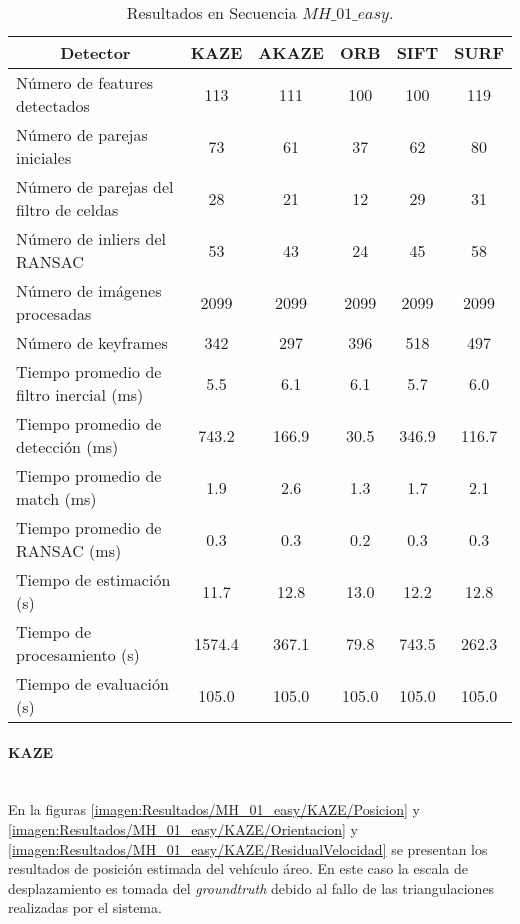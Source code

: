 \begin{table}[H]
	\caption{Resultados en Secuencia $MH\_ 01\_ easy$.}
	\begin{tabular}{|l|c|c|c|c|c|}
		\hline
		\multicolumn{1}{|c|}{\textbf{Detector}} & \textbf{KAZE} & \textbf{AKAZE} & \textbf{ORB} & \textbf{SIFT} & \textbf{SURF} \\ \hline
		Número de features detectados & 113 & 111 & 100 & 100 & 119 \\ \hline
		Número de parejas iniciales & 73 & 61 & 37 & 62 & 80 \\ \hline
		Número de parejas del filtro de celdas & 28 & 21 & 12 & 29 & 31 \\ \hline
		Número de inliers del RANSAC & 53 & 43 & 24 & 45 & 58 \\ \hline
		Número de imágenes procesadas & 2099 & 2099 & 2099 & 2099 & 2099 \\ \hline
		Número de keyframes & 342 & 297 & 396 & 518 & 497 \\ \hline
		Tiempo promedio de filtro inercial (ms) & 5.5 & 6.1 & 6.1 & 5.7 & 6.0 \\ \hline
		Tiempo promedio de detección  (ms) & 743.2 & 166.9 & 30.5 & 346.9 & 116.7 \\ \hline
		Tiempo promedio de match (ms) & 1.9 & 2.6 & 1.3 & 1.7 & 2.1 \\ \hline
		Tiempo promedio de RANSAC (ms) & 0.3 & 0.3 & 0.2 & 0.3 & 0.3 \\ \hline
		Tiempo de estimación (s) & 11.7 & 12.8 & 13.0 & 12.2 & 12.8 \\ \hline
		Tiempo de  procesamiento (s) & 1574.4 & 367.1 & 79.8 & 743.5 & 262.3 \\ \hline
		Tiempo de evaluación (s) & 105.0 & 105.0 & 105.0 & 105.0 & 105.0 \\ \hline
	\end{tabular}
	\label{Tabla/Resultados/MH_01_easy}
\end{table}



\paragraph {KAZE \\ \\}


En la figuras \ref{imagen:Resultados/MH_01_easy/KAZE/Posicion} y \ref{imagen:Resultados/MH_01_easy/KAZE/Orientacion} y \ref{imagen:Resultados/MH_01_easy/KAZE/ResidualVelocidad} se presentan los resultados de posición estimada del vehículo áreo. En este caso la escala de desplazamiento es tomada del \textit{groundtruth} debido al fallo de las triangulaciones realizadas por el sistema.
 
